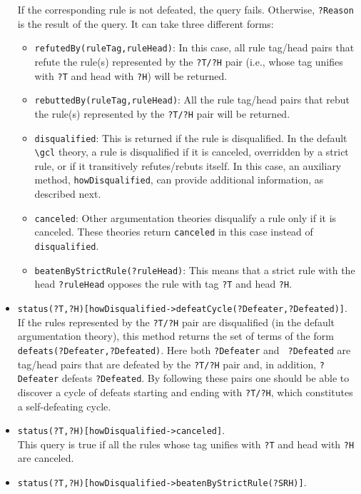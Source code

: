\documentclass[11pt]{article}
\newcommand{\bs}{\textbackslash}
\begin{document}
\begin{itemize}
  If the corresponding rule is not defeated, the query fails.  Otherwise,
  {\tt ?Reason} is the result of the query. It can take three different forms:
  \begin{itemize}
  \item {\tt refutedBy(ruleTag,ruleHead)}: In this case, all rule
    tag/head pairs that refute the rule(s) represented by the {\tt ?T/?H}
    pair (i.e., whose tag unifies with {\tt ?T} and head with {\tt ?H})
    will be returned.
  \item {\tt rebuttedBy(ruleTag,ruleHead)}: All the rule
    tag/head pairs that rebut the rule(s) represented by the {\tt ?T/?H} pair
    will be returned.
  \item {\tt disqualified}: This is returned if the rule is
    disqualified.
    In the default {\tt \bs{}gcl} theory, a rule is
    disqualified if it is canceled, overridden by a strict rule,
    or if it transitively refutes/rebuts itself.
    In this case, an auxiliary method, {\tt howDisqualified}, can provide
    additional information, as described next. 
  \item {\tt canceled}: Other argumentation theories disqualify a rule only
    if it is canceled. These theories return \texttt{canceled} in this case
    instead of \texttt{disqualified}.
  \item \texttt{beatenByStrictRule(?ruleHead)}: This means that a strict
    rule with the head \texttt{?ruleHead} opposes the rule with tag
    \texttt{?T} and head \texttt{?H}.  
  \end{itemize}
\item  {\tt status(?T,?H)[howDisqualified->defeatCycle(?Defeater,?Defeated)]}.\\
  If the rules represented by the {\tt ?T/?H} pair are disqualified (in the
  default argumentation theory), this
  method returns the set of terms of the form {\tt
    defeats(?Defeater,?Defeated)}. Here both {\tt ?Defeater} and {\tt
    ?Defeated} are tag/head pairs that are defeated by the {\tt ?T/?H} pair
  and, in addition, {\tt ?Defeater} defeats {\tt ?Defeated}. By following
  these pairs one should be able
  to discover a cycle of defeats starting and ending
  with {\tt ?T/?H}, which constitutes a self-defeating cycle.
\item  {\tt status(?T,?H)[howDisqualified->canceled]}.\\
  This query is true if all the rules whose tag unifies with
  {\tt ?T} and head with {\tt ?H} are
  canceled.
\item  {\tt status(?T,?H)[howDisqualified->beatenByStrictRule(?SRH)]}.\\

\end{itemize}
\end{document}
